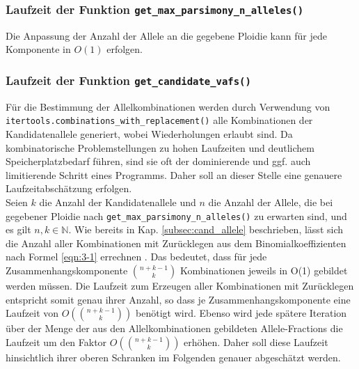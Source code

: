 \subsubsection{Laufzeit der Funktion \lstinline|get_max_parsimony_n_alleles()|}
Die Anpassung der Anzahl der Allele an die gegebene Ploidie kann für jede Komponente in $ O(1) $ erfolgen.\\

\subsubsection{Laufzeit der Funktion \lstinline|get_candidate_vafs()|} \label{subsubsec:cand_vafs}
Für die Bestimmung der Allelkombinationen werden durch Verwendung von \linebreak \lstinline|itertools.combinations_with_replacement()| alle Kombinationen der Kandidatenallele generiert, wobei Wiederholungen erlaubt sind. Da kombinatorische Problemstellungen zu hohen Laufzeiten und deutlichem Speicherplatzbedarf führen, sind sie oft der dominierende und ggf. auch limitierende Schritt eines Programms. Daher soll an dieser Stelle eine genauere Laufzeitabschätzung erfolgen. \\

Seien $k$ die Anzahl der Kandidatenallele und $n$ die Anzahl der Allele, die bei gegebener Ploidie nach \lstinline|get_max_parsimony_n_alleles()| zu erwarten sind, und es gilt $n, k \in \mathds{N} $.  Wie bereits in Kap. \ref{subsec:cand_allele} beschrieben, lässt sich die Anzahl aller Kombinationen mit Zurücklegen aus dem Binomialkoeffizienten nach  Formel \eqref{eqn:3-1} errechnen \cite{tb_stat}. Das bedeutet, dass für jede Zusammenhangskomponente $ \binom{n + k - 1}{k} $ Kombinationen jeweils in O(1) gebildet werden müssen. Die Laufzeit zum Erzeugen aller Kombinationen mit Zurücklegen entspricht somit genau ihrer Anzahl, so dass je Zusammenhangskomponente eine Laufzeit von $ O(\binom{n + k - 1}{k}) $ benötigt wird. Ebenso wird jede spätere Iteration über der Menge der aus den Allelkombinationen gebildeten Allele-Fractions die Laufzeit um den Faktor $ O(\binom{n + k - 1}{k}) $ erhöhen. Daher soll diese Laufzeit hinsichtlich ihrer oberen Schranken im Folgenden genauer abgeschätzt werden. \\

